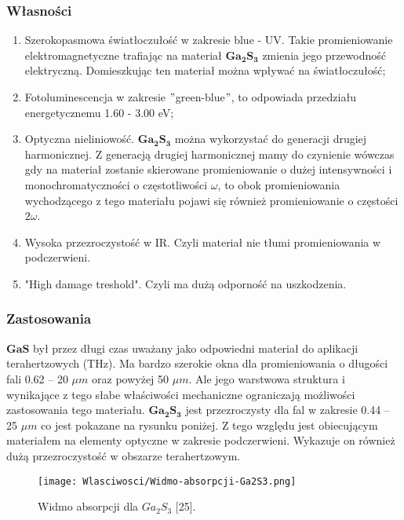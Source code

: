 \subsubsection{Własności}
\begin{enumerate}
	\item Szerokopasmowa światłoczułość w zakresie blue - UV. Takie promieniowanie elektromagnetyczne trafiając na materiał $\mathbf{Ga_{2}S_{3}}$ zmienia jego przewodność elektryczną. Domieszkując ten materiał można wpływać na światłoczułość;
	\item Fotoluminescencja w zakresie $"$green-blue$"$, to odpowiada przedziału energetycznemu 1.60 - 3.00 eV;
	\item Optyczna nieliniowość. $\mathbf{Ga_{2}S_{3}}$ można wykorzystać do generacji drugiej harmonicznej. Z generacją drugiej harmonicznej mamy do czynienie wówczas gdy na materiał zostanie skierowane promieniowanie o dużej intensywności i monochromatyczności o częstotliwości $\omega$, to obok promieniowania wychodzącego z tego materiału pojawi się również promieniowanie o częstości $2\omega$.
	\item Wysoka przezroczystość w IR. Czyli materiał nie tłumi promieniowania w podczerwieni.
	\item "High damage treshold". Czyli ma dużą odporność na uszkodzenia.
\end{enumerate}

\subsubsection{Zastosowania}

$\mathbf{GaS}$ był przez długi czas uważany jako odpowiedni materiał do aplikacji terahertzowych (THz). Ma bardzo szerokie okna dla promieniowania o długości fali 0.62 – 20 $\mu m$ oraz powyżej 50 $\mu m$. Ale jego warstwowa struktura i wynikające z tego słabe właściwości mechaniczne ograniczają możliwości zastosowania tego materiału. $\mathbf{Ga_{2}S_{3}}$ jest przezroczysty dla fal w zakresie 0.44 – 25 $\mu m$ co jest pokazane na rysunku poniżej. Z tego względu jest obiecującym materiałem na elementy optyczne w zakresie podczerwieni. Wykazuje on również dużą przezroczystość w obszarze terahertzowym. 

\begin{figure}[H]
	\begin{center}
		\texttt{[image: Wlasciwosci/Widmo-absorpcji-Ga2S3.png]}
		\caption{Widmo absorpcji dla $Ga_{2}S_{3}$ [25].}
	\end{center}
\end{figure}

